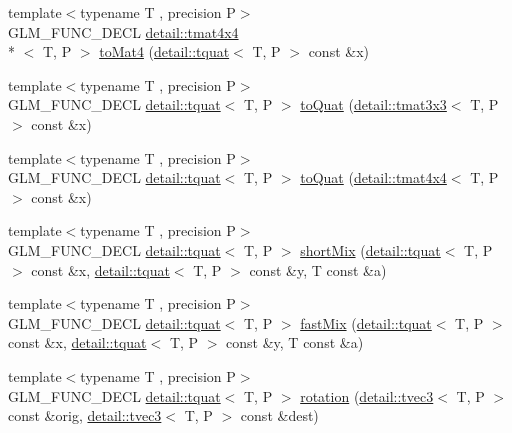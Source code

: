 \begin{DoxyCompactItemize}
\item 
{\footnotesize template$<$typename T , precision P$>$ }\\G\-L\-M\-\_\-\-F\-U\-N\-C\-\_\-\-D\-E\-C\-L \hyperlink{structglm_1_1detail_1_1tmat4x4}{detail\-::tmat4x4}\\*
$<$ T, P $>$ \hyperlink{group__gtx__quaternion_ga5d441af6e45262436e73070269d8470c}{to\-Mat4} (\hyperlink{structglm_1_1detail_1_1tquat}{detail\-::tquat}$<$ T, P $>$ const \&x)
\item 
{\footnotesize template$<$typename T , precision P$>$ }\\G\-L\-M\-\_\-\-F\-U\-N\-C\-\_\-\-D\-E\-C\-L \hyperlink{structglm_1_1detail_1_1tquat}{detail\-::tquat}$<$ T, P $>$ \hyperlink{group__gtx__quaternion_ga7647cfc0f26055a4eea4f99a35964d7b}{to\-Quat} (\hyperlink{structglm_1_1detail_1_1tmat3x3}{detail\-::tmat3x3}$<$ T, P $>$ const \&x)
\item 
{\footnotesize template$<$typename T , precision P$>$ }\\G\-L\-M\-\_\-\-F\-U\-N\-C\-\_\-\-D\-E\-C\-L \hyperlink{structglm_1_1detail_1_1tquat}{detail\-::tquat}$<$ T, P $>$ \hyperlink{group__gtx__quaternion_gab2e47ea15791ee85dfacfd9e952bad64}{to\-Quat} (\hyperlink{structglm_1_1detail_1_1tmat4x4}{detail\-::tmat4x4}$<$ T, P $>$ const \&x)
\item 
{\footnotesize template$<$typename T , precision P$>$ }\\G\-L\-M\-\_\-\-F\-U\-N\-C\-\_\-\-D\-E\-C\-L \hyperlink{structglm_1_1detail_1_1tquat}{detail\-::tquat}$<$ T, P $>$ \hyperlink{group__gtx__quaternion_ga297f92682708e59bda1849ca3aad0fea}{short\-Mix} (\hyperlink{structglm_1_1detail_1_1tquat}{detail\-::tquat}$<$ T, P $>$ const \&x, \hyperlink{structglm_1_1detail_1_1tquat}{detail\-::tquat}$<$ T, P $>$ const \&y, T const \&a)
\item 
{\footnotesize template$<$typename T , precision P$>$ }\\G\-L\-M\-\_\-\-F\-U\-N\-C\-\_\-\-D\-E\-C\-L \hyperlink{structglm_1_1detail_1_1tquat}{detail\-::tquat}$<$ T, P $>$ \hyperlink{group__gtx__quaternion_ga5d1bb2670d0c73fff5912134ba7c024c}{fast\-Mix} (\hyperlink{structglm_1_1detail_1_1tquat}{detail\-::tquat}$<$ T, P $>$ const \&x, \hyperlink{structglm_1_1detail_1_1tquat}{detail\-::tquat}$<$ T, P $>$ const \&y, T const \&a)
\item 
{\footnotesize template$<$typename T , precision P$>$ }\\G\-L\-M\-\_\-\-F\-U\-N\-C\-\_\-\-D\-E\-C\-L \hyperlink{structglm_1_1detail_1_1tquat}{detail\-::tquat}$<$ T, P $>$ \hyperlink{group__gtx__quaternion_ga964b26fdcd9f6f694c1003b0571092a6}{rotation} (\hyperlink{structglm_1_1detail_1_1tvec3}{detail\-::tvec3}$<$ T, P $>$ const \&orig, \hyperlink{structglm_1_1detail_1_1tvec3}{detail\-::tvec3}$<$ T, P $>$ const \&dest)

\end{DoxyCompactItemize}
